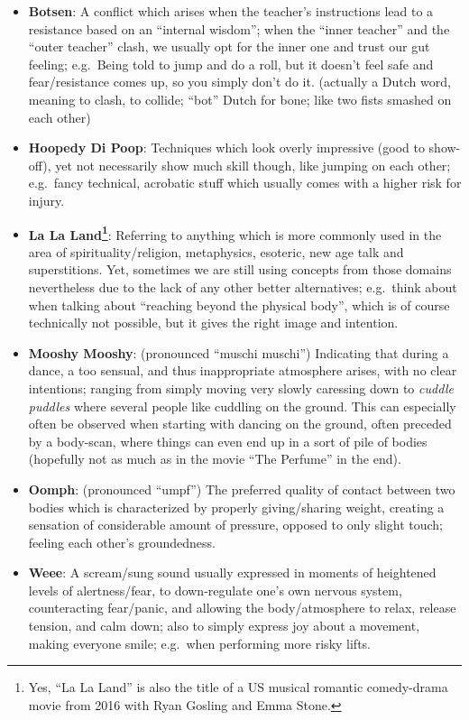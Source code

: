 \begin{itemize}
    \item \textbf{Botsen}: A conflict which arises when the teacher's instructions lead to a resistance based on an ``internal wisdom''; when the ``inner teacher'' and the ``outer teacher'' clash, we usually opt for the inner one and trust our gut feeling; e.g.\ Being told to jump and do a roll, but it doesn't feel safe and fear/resistance comes up, so you simply don't do it.
    (actually a Dutch word, meaning to clash, to collide; ``bot'' Dutch for bone; like two fists smashed on each other)
    \item \textbf{Hoopedy Di Poop}: Techniques which look overly impressive (good to show-off), yet not necessarily show much skill though, like jumping on each other; e.g.\ fancy technical, acrobatic stuff which usually comes with a higher risk for injury.
    \item \textbf{La La Land\footnote{Yes, ``La La Land'' is also the title of a US musical romantic comedy-drama movie from 2016 with Ryan Gosling and Emma Stone.}}: Referring to anything which is more commonly used in the area of spirituality/religion, metaphysics, esoteric, new age talk and superstitions.
    Yet, sometimes we are still using concepts from those domains nevertheless due to the lack of any other better alternatives; e.g.\ think about when talking about ``reaching beyond the physical body'', which is of course technically not possible, but it gives the right image and intention.
    \item \textbf{Mooshy Mooshy}: (pronounced ``muschi muschi'') Indicating that during a dance, a too sensual, and thus inappropriate atmosphere arises, with no clear intentions; ranging from simply moving very slowly caressing down to \textit{cuddle puddles} where several people like cuddling on the ground.
    This can especially often be observed when starting with dancing on the ground, often preceded by a body-scan, where things can even end up in a sort of pile of bodies (hopefully not as much as in the movie ``The Perfume'' in the end).
    \item \textbf{Oomph}: (pronounced ``umpf'') The preferred quality of contact between two bodies which is characterized by properly giving/sharing weight, creating a sensation of considerable amount of pressure, opposed to only slight touch; feeling each other's groundedness.
    \item \textbf{Weee}: A scream/sung sound usually expressed in moments of heightened levels of alertness/fear, to down-regulate one's own nervous system, counteracting fear/panic, and allowing the body/atmosphere to relax, release tension, and calm down; also to simply express joy about a movement, making everyone smile; e.g.\ when performing more risky lifts.
\end{itemize}

